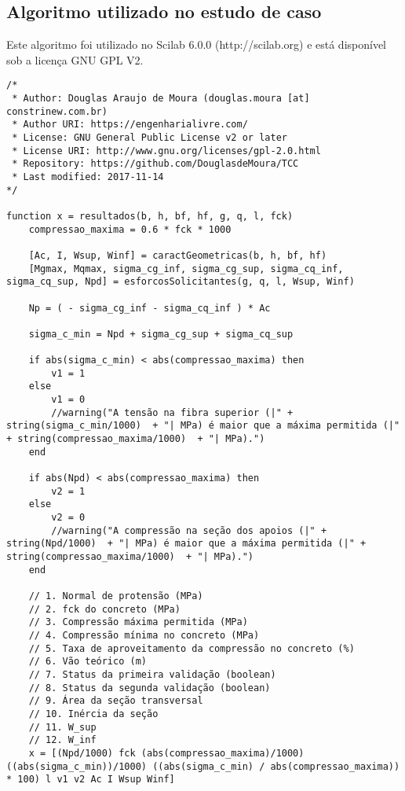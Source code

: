 \documentclass[
	12pt,				%
	openright,			%
	oneside,			%
	a4paper,			%
	chapter=TITLE,		%
	english,			%
	french,				%
	spanish,			%
	brazil				%
	]{abntex2}
\begin{document}

\begin{apendicesenv}

\partapendices

\chapter{Algoritmo utilizado no estudo de caso}
\label{script}

Este algoritmo foi utilizado no Scilab 6.0.0 (http://scilab.org) e está disponível sob a licença GNU GPL V2.

%
\begin{lstlisting}
/*
 * Author: Douglas Araujo de Moura (douglas.moura [at] constrinew.com.br)
 * Author URI: https://engenharialivre.com/
 * License: GNU General Public License v2 or later
 * License URI: http://www.gnu.org/licenses/gpl-2.0.html
 * Repository: https://github.com/DouglasdeMoura/TCC
 * Last modified: 2017-11-14
*/

function x = resultados(b, h, bf, hf, g, q, l, fck)
    compressao_maxima = 0.6 * fck * 1000

    [Ac, I, Wsup, Winf] = caractGeometricas(b, h, bf, hf)
    [Mgmax, Mqmax, sigma_cg_inf, sigma_cg_sup, sigma_cq_inf, sigma_cq_sup, Npd] = esforcosSolicitantes(g, q, l, Wsup, Winf)

    Np = ( - sigma_cg_inf - sigma_cq_inf ) * Ac

    sigma_c_min = Npd + sigma_cg_sup + sigma_cq_sup

    if abs(sigma_c_min) < abs(compressao_maxima) then
        v1 = 1
    else
        v1 = 0
        //warning("A tensão na fibra superior (|" + string(sigma_c_min/1000)  + "| MPa) é maior que a máxima permitida (|" + string(compressao_maxima/1000)  + "| MPa).")
    end

    if abs(Npd) < abs(compressao_maxima) then
        v2 = 1
    else
        v2 = 0
        //warning("A compressão na seção dos apoios (|" + string(Npd/1000)  + "| MPa) é maior que a máxima permitida (|" + string(compressao_maxima/1000)  + "| MPa).")
    end

    // 1. Normal de protensão (MPa)
    // 2. fck do concreto (MPa)
    // 3. Compressão máxima permitida (MPa)
    // 4. Compressão mínima no concreto (MPa)
    // 5. Taxa de aproveitamento da compressão no concreto (%)
    // 6. Vão teórico (m)
    // 7. Status da primeira validação (boolean)
    // 8. Status da segunda validação (boolean)
    // 9. Área da seção transversal
    // 10. Inércia da seção
    // 11. W_sup
    // 12. W_inf
    x = [(Npd/1000) fck (abs(compressao_maxima)/1000) ((abs(sigma_c_min))/1000) ((abs(sigma_c_min) / abs(compressao_maxima)) * 100) l v1 v2 Ac I Wsup Winf]


\end{lstlisting}
\end{apendicesenv}
\end{document}
